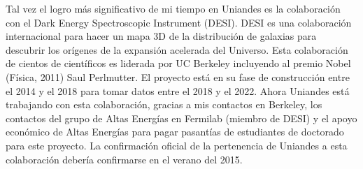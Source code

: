 \documentclass{report}
\begin{document}
Tal vez el logro más significativo de mi tiempo en Uniandes es la
colaboración con el Dark Energy Spectroscopic Instrument (DESI). DESI
es una colaboración internacional para hacer un mapa 3D de la
distribución de galaxias para descubrir los orígenes de la expansión
acelerada del Universo. Esta colaboración de cientos de científicos es
liderada por UC Berkeley incluyendo al premio Nobel (Física, 2011)
Saul Perlmutter. El proyecto está en su fase de construcción entre el
2014 y el 2018 para tomar datos entre el 2018 y el 2022. Ahora
Uniandes está trabajando con esta colaboración, gracias a mis
contactos en Berkeley, los contactos del grupo de Altas Energías en
Fermilab (miembro de DESI) y el apoyo económico de Altas Energías para
pagar pasantías de estudiantes de doctorado para este proyecto. La
confirmación oficial de la pertenencia de Uniandes a esta colaboración
debería confirmarse en el verano del 2015. 



 
\end{document}
